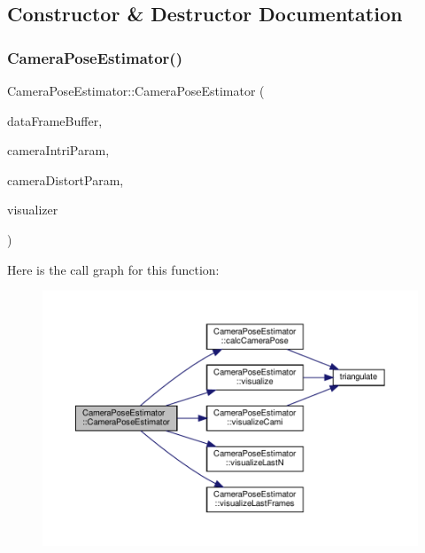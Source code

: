 \subsection{Constructor \& Destructor Documentation}
\mbox{\label{classCameraPoseEstimator_a441b62732e43db66f31cb231cd6a0f68}} 
\subsubsection{\texorpdfstring{Camera\+Pose\+Estimator()}{CameraPoseEstimator()}}
{\footnotesize\ttfamily Camera\+Pose\+Estimator\+::\+Camera\+Pose\+Estimator (\begin{DoxyParamCaption}\item[{boost\+::circular\+\_\+buffer$<$ \hyperlink{structDataFrame}{Data\+Frame} $>$ \&}]{data\+Frame\+Buffer,  }\item[{cv\+::\+Mat}]{camera\+Intri\+Param,  }\item[{cv\+::\+Mat}]{camera\+Distort\+Param,  }\item[{cv\+::viz\+::\+Viz3d \&}]{visualizer }\end{DoxyParamCaption})\hspace{0.3cm}{\ttfamily [inline]}}

Here is the call graph for this function\+:\nopagebreak
\begin{figure}[H]
\begin{center}
\leavevmode
\includegraphics[width=350pt]{classCameraPoseEstimator_a441b62732e43db66f31cb231cd6a0f68_cgraph}
\end{center}
\end{figure}


